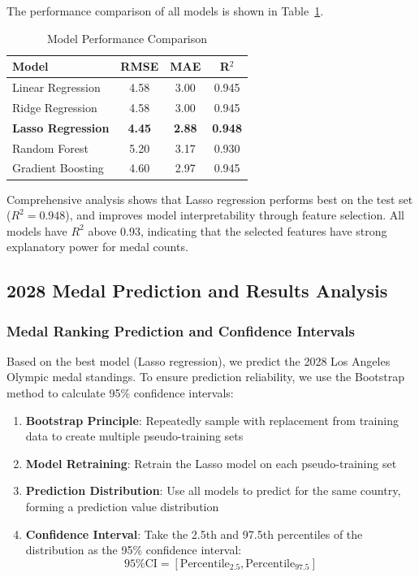 \documentclass{mcmthesis}
\begin{document}
The performance comparison of all models is shown in Table~\ref{tab:model_comparison}.

\begin{table}[htbp]
\centering
\caption{Model Performance Comparison}
\label{tab:model_comparison}
\begin{tabular}{lccc}
\toprule
\textbf{Model} & \textbf{RMSE} & \textbf{MAE} & \textbf{R$^2$} \\
\midrule
Linear Regression & 4.58 & 3.00 & 0.945 \\
Ridge Regression & 4.58 & 3.00 & 0.945 \\
\textbf{Lasso Regression} & \textbf{4.45} & \textbf{2.88} & \textbf{0.948} \\
Random Forest & 5.20 & 3.17 & 0.930 \\
Gradient Boosting & 4.60 & 2.97 & 0.945 \\
\bottomrule
\end{tabular}
\end{table}

Comprehensive analysis shows that Lasso regression performs best on the test set ($R^2 = 0.948$), and improves model interpretability through feature selection. All models have $R^2$ above 0.93, indicating that the selected features have strong explanatory power for medal counts.

\subsection{2028 Medal Prediction and Results Analysis}

\subsubsection{Medal Ranking Prediction and Confidence Intervals}

Based on the best model (Lasso regression), we predict the 2028 Los Angeles Olympic medal standings. To ensure prediction reliability, we use the Bootstrap method to calculate 95\% confidence intervals:

\begin{enumerate}
    \item \textbf{Bootstrap Principle}: Repeatedly sample with replacement from training data to create multiple pseudo-training sets
    \item \textbf{Model Retraining}: Retrain the Lasso model on each pseudo-training set
    \item \textbf{Prediction Distribution}: Use all models to predict for the same country, forming a prediction value distribution
    \item \textbf{Confidence Interval}: Take the 2.5th and 97.5th percentiles of the distribution as the 95\% confidence interval:
    \begin{equation}
        \text{95\% CI} = [\text{Percentile}_{2.5}, \text{Percentile}_{97.5}]
    \end{equation}
\end{enumerate}
\end{document}
